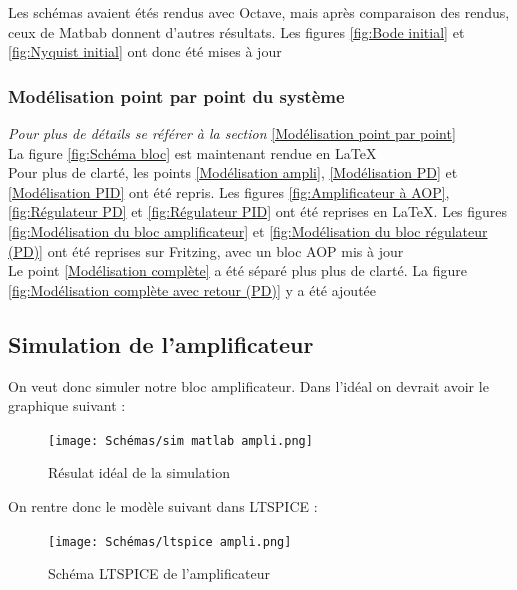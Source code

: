 \documentclass[11pt,a4paper]{article}
\begin{document}
Les schémas avaient étés rendus avec Octave, mais après comparaison des rendus, ceux de Matbab donnent d'autres résultats. Les figures \ref{fig:Bode initial} et \ref{fig:Nyquist initial} ont donc été mises à jour

\subsubsection{Modélisation point par point du système}
\textit{Pour plus de détails se référer à la section} \ref{Modélisation point par point}\\

La figure \ref{fig:Schéma bloc} est maintenant rendue en \LaTeX\\

Pour plus de clarté, les points \ref{Modélisation ampli}, \ref{Modélisation PD} et \ref{Modélisation PID} ont été repris. Les figures \ref{fig:Amplificateur à AOP}, \ref{fig:Régulateur PD} et \ref{fig:Régulateur PID} ont été reprises en \LaTeX. Les figures \ref{fig:Modélisation du bloc amplificateur} et \ref{fig:Modélisation du bloc régulateur (PD)} ont été reprises sur Fritzing, avec un bloc AOP mis à jour\\

Le point \ref{Modélisation complète} a été séparé plus plus de clarté. La figure \ref{fig:Modélisation complète avec retour (PD)} y a été ajoutée

\subsection{Simulation de l'amplificateur}
\begin{multicols}{2}
On veut donc simuler notre bloc amplificateur. Dans l'idéal on devrait avoir le graphique suivant :
\begin{figure} [H]
\begin{center}
\texttt{[image: Schémas/sim matlab ampli.png]} 
\end{center}
\caption{Résulat idéal de la simulation}
\end{figure}

On rentre donc le modèle suivant dans LTSPICE :
\begin{figure} [H]
\begin{center}
\texttt{[image: Schémas/ltspice ampli.png]} 
\end{center}
\caption{Schéma LTSPICE de l'amplificateur}
\end{figure}
\end{multicols}
\end{document}

